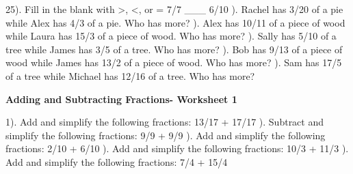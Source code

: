 \documentclass{article}%
\begin{document}
25). Fill in the blank with >, <, or = 7/7 \_\_\_ 6/10%
\newline%
\newline%
). Rachel has 3/20 of a pie while Alex has 4/3 of a pie. Who has more?%
\newline%
\newline%
). Alex has 10/11 of a piece of wood while Laura has 15/3 of a piece of wood. Who has more?%
\newline%
\newline%
). Sally has 5/10 of a tree while James has 3/5 of a tree. Who has more?%
\newline%
\newline%
). Bob has 9/13 of a piece of wood while James has 13/2 of a piece of wood. Who has more?%
\newline%
\newline%
). Sam has 17/5 of a tree while Michael has 12/16 of a tree. Who has more?%
\newline%
\newline%
\newline%
\pagebreak%
\large%
\begin{center}%
\textbf{Adding and Subtracting Fractions- Worksheet 1}%
\newline%
\end{center} \normalsize%
1). Add and simplify the following fractions: 13/17 + 17/17%
\newline%
\newline%
). Subtract and simplify the following fractions: 9/9 + 9/9%
\newline%
\newline%
). Add and simplify the following fractions: 2/10 + 6/10%
\newline%
\newline%
). Add and simplify the following fractions: 10/3 + 11/3%
\newline%
\newline%
). Add and simplify the following fractions: 7/4 + 15/4%
\newline%
\newline%
\end{document}
